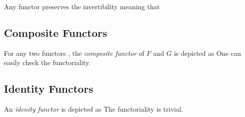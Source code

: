 \begin{proposition}\label{f.p.inv}
Any functor preserves the invertibility meaning that
\end{proposition}

\subsection{Composite Functors}

For any two functors 
, the \emph{composite functor} of $F$ and $G$
is depicted as 
One can easily check the functoriality.


\subsection{Identity Functors}

An \emph{idenity functor}
is depicted as
The functoriality is trivial.


